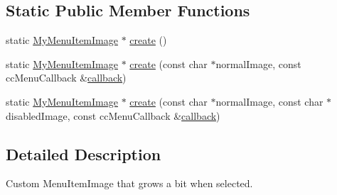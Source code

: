 \subsection*{\-Static \-Public \-Member \-Functions}
\begin{DoxyCompactItemize}
\item 
static \hyperlink{class_my_menu_item_image}{\-My\-Menu\-Item\-Image} $\ast$ \hyperlink{class_my_menu_item_image_a72ec449555c4b514536a85f1b432d95c}{create} ()
\item 
static \hyperlink{class_my_menu_item_image}{\-My\-Menu\-Item\-Image} $\ast$ \hyperlink{class_my_menu_item_image_ae2548575d729af45b1bf39237580f984}{create} (const char $\ast$normal\-Image, const cc\-Menu\-Callback \&\hyperlink{_game_list_8h_a5911a49060cb775fd6a306bb797504bb}{callback})
\item 
static \hyperlink{class_my_menu_item_image}{\-My\-Menu\-Item\-Image} $\ast$ \hyperlink{class_my_menu_item_image_ab30eff7cb9a66c450cd7b43f88dd76bc}{create} (const char $\ast$normal\-Image, const char $\ast$disabled\-Image, const cc\-Menu\-Callback \&\hyperlink{_game_list_8h_a5911a49060cb775fd6a306bb797504bb}{callback})
\end{DoxyCompactItemize}


\subsection{\-Detailed \-Description}
\-Custom \-Menu\-Item\-Image that grows a bit when selected. 

